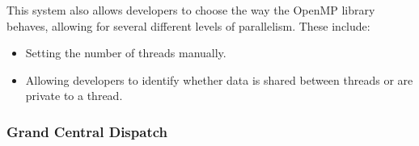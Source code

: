 This system also allows developers to choose the way the OpenMP library behaves, allowing for several different levels of parallelism.
These include:
\begin{itemize}[noitemsep]
\item Setting the number of threads manually.
\item Allowing developers to identify whether data is shared between threads or are private to a thread.
\end{itemize}

\subsubsection{Grand Central Dispatch}\label{subsubsec:Grand_Central_Dispatch}
